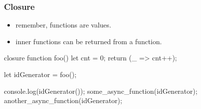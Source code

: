 \begin{frame}[fragile] \frametitle{Closure}

\begin{itemize}
  \item remember, functions are values.
  \item inner functions can be returned from a function.
\end{itemize}

\vspace{4mm}

\begin{CodeBox}{closure}
function foo() {
  let cnt = 0;
  return (_ => cnt++);
}

let idGenerator = foo();

console.log(idGenerator());
some_async_function(idGenerator);
another_async_function(idGenerator);
\end{CodeBox}
\end{frame}

